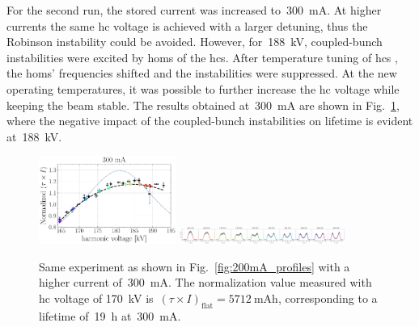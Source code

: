 \documentclass[a4paper,
               ]{jacow}
\begin{document}
For the second run, the stored current was increased to~\SI{300}{\milli\ampere}. At higher currents the same \gls{hc} voltage is achieved with a larger detuning, thus the Robinson instability could be avoided. However, for~\SI{188}{\kilo\volt}, coupled-bunch instabilities were excited by \glspl{hom} of the \glspl{hc}. After temperature tuning of \glspl{hc} , the \glspl{hom}' frequencies shifted and the instabilities were suppressed. At the new operating temperatures, it was possible to further increase the \gls{hc} voltage while keeping the beam stable. The results obtained at~\SI{300}{\milli\ampere} are shown in Fig.~\ref{fig:300mA_profiles}, where the negative impact of the coupled-bunch instabilities on lifetime is evident at~\SI{188}{\kilo\volt}.
\begin{figure}
    \centering
    \includegraphics[width=0.4\textwidth]{WEPR42_f5a.pdf}
    \includegraphics[width=0.48\textwidth]{WEPR42_f5b.pdf}
    \caption{Same experiment as shown in Fig.~\ref{fig:200mA_profiles} with a higher current of~\SI{300}{\milli\ampere}. The normalization value measured with \gls{hc} voltage of \SI{170}{\kilo\volt} is~$(\tau \times I)_\text{flat} = \SI{5712}{\milli\ampere\hour}$, corresponding to a lifetime of~\SI{19}{\hour} at~\SI{300}{\milli\ampere}.}
    \label{fig:300mA_profiles}
\end{figure}

\end{document}
